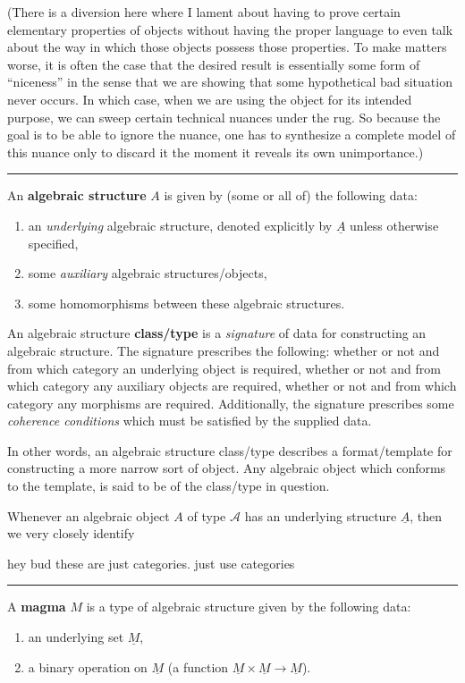 \documentclass[12pt]{article}
\newcommand{\keyword}[1]{\textbf{#1}}
\newcommand{\sepline}{\rule{\textwidth}{0.4pt}}
\theoremstyle{definition}
\newcommand{\<}{\left\langle}
\renewcommand{\>}{\right\rangle}
\newcommand{\udl}{\underline}
\begin{document}
(There is a diversion here where I lament about having to prove certain elementary properties of objects without having the proper language to even talk about the way in which those objects possess those properties.
To make matters worse, it is often the case that the desired result is essentially some form of ``niceness'' in the sense that we are showing that some hypothetical bad situation never occurs. In which case, when we are using the object for its intended purpose, we can sweep certain technical nuances under the rug.
So because the goal is to be able to ignore the nuance, one has to synthesize a complete model of this nuance only to discard it the moment it reveals its own unimportance.)

\sepline

An \keyword{algebraic structure} $A$ is given by (some or all of) the following data:
\begin{enumerate}[(1)]
    \item an \emph{underlying} algebraic structure, denoted explicitly by $\udl{A}$ unless otherwise specified,
    \item some \emph{auxiliary} algebraic structures/objects,
    \item some homomorphisms between these algebraic structures.
\end{enumerate}

An algebraic structure \keyword{class/type} is a \emph{signature} of data for constructing an algebraic structure.
The signature prescribes the following: whether or not and from which category an underlying object is required, whether or not and from which category any auxiliary objects are required, whether or not and from which category any morphisms are required.
Additionally, the signature prescribes some \emph{coherence conditions} which must be satisfied by the supplied data.

In other words, an algebraic structure class/type describes a format/template for constructing a more narrow sort of object.
Any algebraic object which conforms to the template, is said to be of the class/type in question.

Whenever an algebraic object $A$ of type $\mathcal{A}$ has an underlying structure $\udl{A}$, then we very closely identify 

hey bud these are just categories. just use categories

\sepline

A \keyword{magma} $M$ is a type of algebraic structure given by the following data:
\begin{enumerate}[(1)]
    \item an underlying set $\udl{M}$,
    \item a binary operation on $\udl{M}$ (a function $\udl{M} \times \udl{M} \to \udl{M}$).
\end{enumerate}
\end{document}
